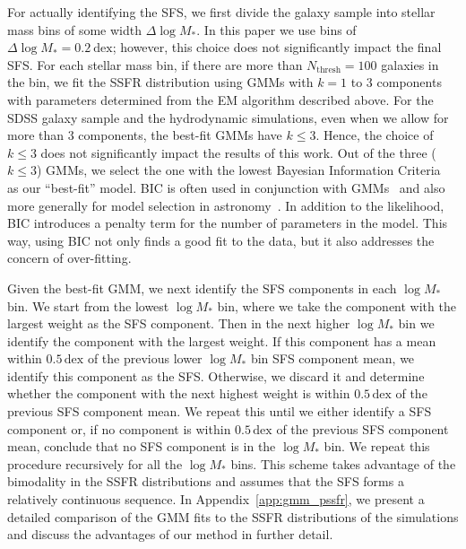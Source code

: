\documentclass[tighten, preprint]{aastex62}
\begin{document}
For actually identifying the SFS, we first divide the galaxy 
sample into stellar mass bins of some width $\Delta \log M_{*}$. In this paper 
we use bins of $\Delta \log M_* = 0.2\ \mathrm{dex}$; however, this 
choice does not significantly impact the final SFS. For each stellar 
mass bin, if there are more than $N_\mathrm{thresh}{=}100$ galaxies in the bin, 
we fit the SSFR distribution using GMMs with $k{=}1$ to 3 components with 
parameters determined from the EM algorithm described above. 
For the SDSS galaxy sample and the hydrodynamic simulations, even when we 
allow for more than 3 components, the best-fit GMMs have $k\leq3$. Hence, the 
choice of $k\leq3$ does not significantly impact the results of this work.
Out of the three ($k\leq3$) GMMs, we select the one with the lowest Bayesian 
Information Criteria~\citep[BIC;][]{schwarz1978} as our ``best-fit'' model. 
BIC is often used in conjunction with GMMs~\citep[\emph{e.g.}][]{leroux1992,roeder1997,fraley1998,steele2010performance} 
and also more generally for model selection in 
astronomy~\citep[\emph{e.g.}][]{liddle2007,broderick2011,vakili2016}.
In addition to the likelihood, BIC introduces a penalty term for the number
of parameters in the model. This way, using BIC not only finds a good fit to 
the data, but it also addresses the concern of over-fitting. 

Given the best-fit GMM, we next identify the SFS components in each $\log M_*$
bin. We start from the lowest $\log M_*$ bin, where we take the component with 
the largest weight as the SFS component. Then in the next higher $\log M_*$ bin
we identify the component with the largest weight. If this 
component has a mean within $0.5\,\mathrm{dex}$ of the previous lower $\log M_*$ 
bin SFS component mean, we identify this component as the SFS. Otherwise, we 
discard it and determine whether the component with the next highest weight 
is within $0.5\,\mathrm{dex}$ of the previous SFS component mean. We 
repeat this until we either identify a SFS component or, if no 
component is within $0.5\,\mathrm{dex}$ of the previous SFS component mean,
conclude that no SFS component is in the $\log M_*$ bin. We repeat this 
procedure recursively for all the $\log M_*$ bins. This scheme takes advantage 
of the bimodality in the SSFR distributions and assumes that the SFS forms a 
relatively continuous sequence. In Appendix~\ref{app:gmm_pssfr}, we present a 
detailed comparison of the GMM fits to the SSFR distributions of the simulations 
and discuss the advantages of our method in further detail.
\end{document}
